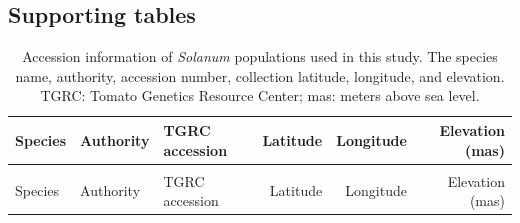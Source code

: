 \documentclass[
  letterpaper,
  DIV=11,
  numbers=noendperiod]{scrartcl}
\begin{document}
\subsection{Supporting tables}\label{supporting-tables}

\begin{landscape}

\begin{longtable}{>{\raggedright\arraybackslash}p{3.25cm}llrrr}

\caption{\label{tbl-populations}Accession information of \emph{Solanum}
populations used in this study. The species name, authority, accession
number, collection latitude, longitude, and elevation. TGRC: Tomato
Genetics Resource Center; mas: meters above sea level.}

\tabularnewline

\toprule
Species & Authority & TGRC accession & Latitude & Longitude & Elevation (mas)\\
\midrule
\endfirsthead
\multicolumn{6}{@{}l}{\textit{(continued)}}\\
\toprule
Species & Authority & TGRC accession & Latitude & Longitude & Elevation (mas)\\
\midrule
\endhead


\end{longtable}
\end{landscape}
\end{document}
